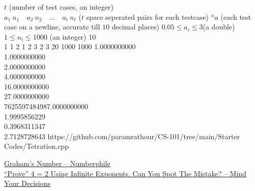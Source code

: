 \documentclass[../../Problems]{subfiles}
\begin{document}
\begin{testcases}
	{$t$ \hfill(number of test cases, an integer)\\
	$a_1\ n_1\quad a_2\ n_2\quad \ldots\quad a_t\ n_t$ \hfill($t$ space seperated pairs for each testcase)}
	{${^{n}a}$ \hfill(each test case on a newline, accurate till $10$ decimal places)}
	{$0.05 \leq a_i \leq 3$\hfill(a double)\\
	$1 \leq n_i \leq 1000$ \hfill(an integer)}
	{10\\1 1 2 1 2 3 2 3 20 1000  1000}
	{1.0000000000\\1.0000000000\\2.0000000000\\4.0000000000\\16.0000000000\\27.0000000000\\7625597484987.0000000000\\1.9995856229\\0.3968311347\\2.7128728643}
	{https://github.com/paramrathour/CS-101/tree/main/Starter Codes/Tetration.cpp}
\end{testcases}
\begin{funvideo}
\href{https://youtu.be/XTeJ64KD5cg}{Graham's Number -- Numberphile}
\\\href{https://youtu.be/DmP3sFIZ0XE}{``Prove'' 4 = 2 Using Infinite Exponents. Can You Spot The Mistake? -- Mind Your Decisions}
\end{funvideo}
\end{document}

